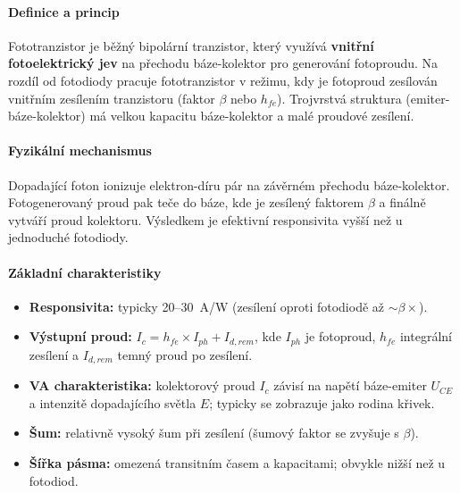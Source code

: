 \documentclass[a4paper, 12pt]{article}
\begin{document}
                \paragraph{Definice a princip}
                Fototranzistor je běžný bipolární tranzistor, který využívá \textbf{vnitřní fotoelektrický jev}
                na přechodu báze-kolektor pro generování fotoproudu. Na rozdíl od fotodiody pracuje
                fototranzistor v režimu, kdy je fotoproud zesílován vnitřním zesílením tranzistoru
                (faktor $\beta$ nebo $h_{fe}$). Trojvrstvá struktura (emiter-báze-kolektor) má
                velkou kapacitu báze-kolektor a malé proudové zesílení.

                \paragraph{Fyzikální mechanismus}
                    Dopadající foton ionizuje elektron-díru pár na závěrném přechodu báze-kolektor.
                    Fotogenerovaný proud pak teče do báze, kde je zesílený faktorem $\beta$ a finálně
                    vytváří proud kolektoru. Výsledkem je efektivní responsivita vyšší než u jednoduché
                    fotodiody.

                \paragraph{Základní charakteristiky}
                \begin{itemize}
                    \item \textbf{Responsivita:} typicky 20--30~A/W (zesílení oproti fotodiodě až $\sim \beta \times$).
                    \item \textbf{Výstupní proud:} $I_c = h_{fe} \times I_{ph} + I_{d,rem}$,
                    kde $I_{ph}$ je fotoproud, $h_{fe}$ integrální zesílení a $I_{d,rem}$ temný proud po zesílení.
                    \item \textbf{VA charakteristika:} kolektorový proud $I_c$ závisí na napětí báze-emiter $U_{CE}$
                    a intenzitě dopadajícího světla $E$; typicky se zobrazuje jako rodina křivek.
                    \item \textbf{Šum:} relativně vysoký šum při zesílení (šumový faktor se zvyšuje s $\beta$).
                    \item \textbf{Šířka pásma:} omezená transitním časem a kapacitami; obvykle nižší než u fotodiod.
                \end{itemize}
\end{document}
